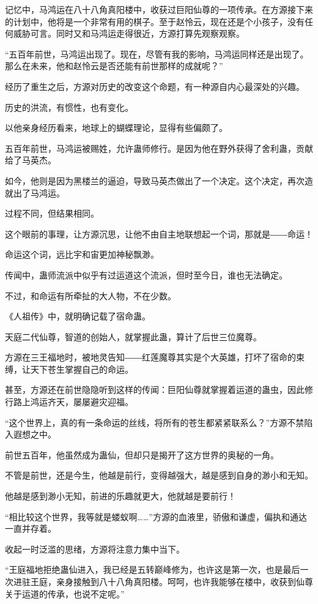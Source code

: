 \begin{this_body}
记忆中，马鸿运在八十八角真阳楼中，收获过巨阳仙尊的一项传承。在方源接下来的计划中，他将是一个非常有用的棋子。至于赵怜云，现在还是个小孩子，没有任何威胁可言。同时又和马鸿运走得很近，方源打算先观察观察。

“五百年前世，马鸿运出现了。现在，尽管有我的影响，马鸿运同样还是出现了。那么在未来，他和赵怜云是否还能有前世那样的成就呢？”

经历了重生之后，方源对历史的改变这个命题，有一种源自内心最深处的兴趣。

历史的洪流，有惯性，也有变化。

以他亲身经历看来，地球上的蝴蝶理论，显得有些偏颇了。

五百年前世，马鸿运被赐姓，允许蛊师修行。是因为他在野外获得了舍利蛊，贡献给了马英杰。

如今，他则是因为黑楼兰的逼迫，导致马英杰做出了一个决定。这个决定，再次造就出了马鸿运。

过程不同，但结果相同。

这个眼前的事理，让方源沉思，让他不由自主地联想起一个词，那就是――命运！

命运这个词，远比宇和宙更加神秘飘渺。

传闻中，蛊师流派中似乎有过运道这个流派，但时至今日，谁也无法确定。

不过，和命运有所牵扯的大人物，不在少数。

《人祖传》中，就明确记载了宿命蛊。

天庭二代仙尊，智道的创始人，就掌握此蛊，算计了后世三位魔尊。

方源在三王福地时，被地灵告知――红莲魔尊其实是个大英雄，打坏了宿命的束缚，让天下苍生掌握自己的命运。

甚至，方源还在前世隐隐听到这样的传闻：巨阳仙尊就掌握着运道的蛊虫，因此修行路上鸿运齐天，屡屡避灾迎福。

“这个世界上，真的有一条命运的丝线，将所有的苍生都紧紧联系么？”方源不禁陷入遐想之中。

前世五百年，他虽然成为蛊仙，但却只是揭开了这方世界的奥秘的一角。

不管是前世，还是今生，他越是前行，变得越强大，越是感到自身的渺小和无知。

他越是感到渺小无知，前进的乐趣就更大，他就越是要前行！

“相比较这个世界，我等就是蝼蚁啊……”方源的血液里，骄傲和谦虚，偏执和通达一直并存着。

收起一时泛滥的思绪，方源将注意力集中当下。

“王庭福地拒绝蛊仙进入，我已经是五转巅峰修为，也许这是第一次，也是最后一次进驻王庭，亲身接触到八十八角真阳楼。呵呵，也许我能够在楼中，收获到仙尊关于运道的传承，也说不定呢。”


\end{this_body}
